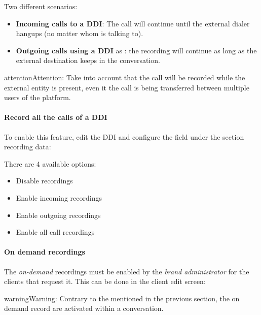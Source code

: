 \documentclass[letterpaper,10pt,english]{sphinxmanual}
\begin{document}
Two different scenarios:
\begin{itemize}
\item {} 
\textbf{Incoming calls to a DDI}: The call will continue until the external
dialer hangups (no matter whom is talking to).

\item {} 
\textbf{Outgoing calls using a DDI} as {\hyperref[administration_portal/client/vpbx/ddis:ddis]{}}: the
recording will continue as long as the external destination keeps in the
conversation.

\end{itemize}

\begin{notice}{attention}{Attention:}
Take into account that the call will be recorded while the
external entity is present, even it the call is being transferred between
multiple users of the platform.
\end{notice}
\paragraph{Record all the calls of a DDI}

To enable this feature, edit the DDI and configure the field under the section
recording data:

There are 4 available options:
\begin{itemize}
\item {} 
Disable recordings

\item {} 
Enable incoming recordings

\item {} 
Enable outgoing recordings

\item {} 
Enable all call recordings

\end{itemize}


\paragraph{On demand recordings}
\label{administration_portal/client/residential/calls/call_recordings:on-demand-recordings}
The \emph{on-demand} recordings must be enabled by the \emph{brand administrator} for the
clients that request it. This can be done in the client edit screen:

\begin{notice}{warning}{Warning:}
Contrary to the {\hyperref[administration_portal/platform/services:services]{}} mentioned in the
previous section, the on demand record are activated within a conversation.
\end{notice}
\end{document}
